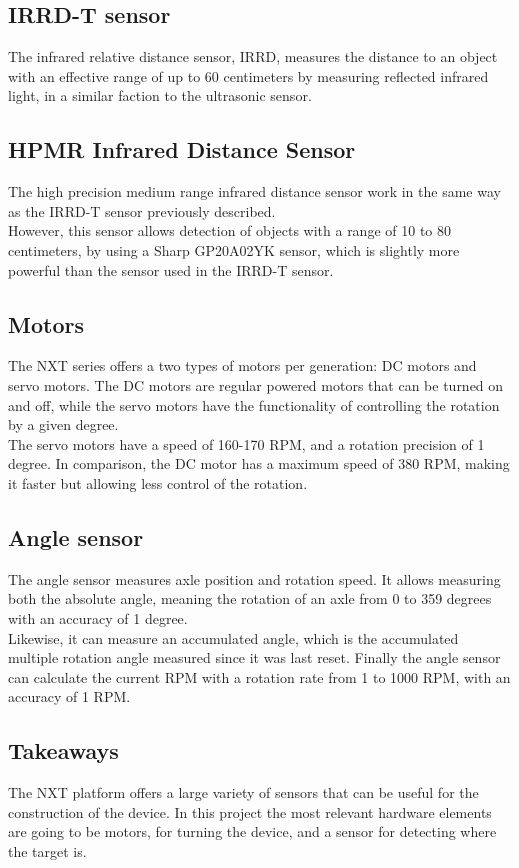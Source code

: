 \subsection*{IRRD-T sensor}
The infrared relative distance sensor, IRRD, measures the distance to an object with an effective range of up to 60 centimeters by measuring reflected infrared light, in a similar faction to the ultrasonic sensor.

\subsection*{HPMR Infrared Distance Sensor}
\label{anal:distance}
The high precision medium range infrared distance sensor work in the same way as the IRRD-T sensor previously described.\\
However, this sensor allows detection of objects with a range of 10 to 80 centimeters, by using a Sharp GP20A02YK sensor, which is slightly more powerful than the sensor used in the IRRD-T sensor.

\subsection*{Motors}
The NXT series offers a two types of motors per generation: DC motors and servo motors.
The DC motors are regular powered motors that can be turned on and off, while the servo motors have the functionality of controlling the rotation by a given degree.\\
The servo motors have a speed of 160-170 RPM, and a rotation precision of 1 degree.
In comparison, the DC motor has a maximum speed of 380 RPM, making it faster but allowing less control of the rotation.

\subsection*{Angle sensor}
The angle sensor measures axle position and rotation speed.
It allows measuring both the absolute angle, meaning the rotation of an axle from 0 to 359 degrees with an accuracy of 1 degree.\\
Likewise, it can measure an accumulated angle, which is the accumulated multiple rotation angle measured since it was last reset.
Finally the angle sensor can calculate the current RPM with a rotation rate from 1 to 1000 RPM, with an accuracy of 1 RPM.

\subsection*{Takeaways}
The NXT platform offers a large variety of sensors that can be useful for the construction of the device.
In this project the most relevant hardware elements are going to be motors, for turning the device, and a sensor for detecting where the target is. 
